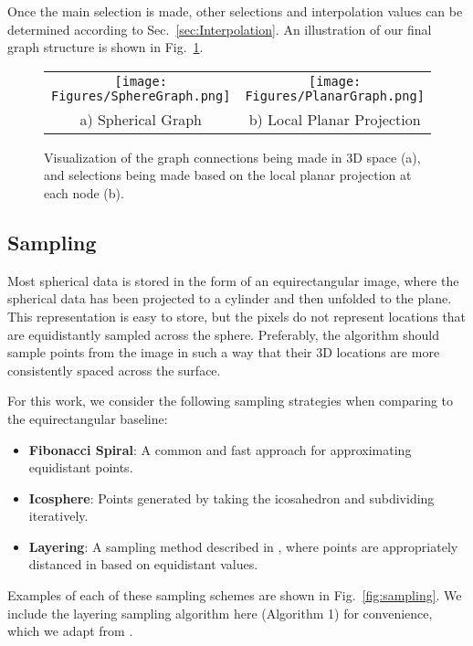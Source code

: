 \documentclass[10pt,twocolumn,letterpaper]{article}
\begin{document}
\noindent Once the main selection is made, other selections and interpolation values can be determined according to Sec.~\ref{sec:Interpolation}. An illustration of our final graph structure is shown in Fig.~\ref{fig:sphericalgraph}.

\begin{figure}
\begin{center}
\begin{tabular}{cc}
\texttt{[image: Figures/SphereGraph.png]}
& \texttt{[image: Figures/PlanarGraph.png]}
\\
a) Spherical Graph &
b) Local Planar Projection
\end{tabular}
\end{center}
   \caption{Visualization of the graph connections being made in 3D space (a), and selections being made based on the local planar projection at each node (b).
   }
\label{fig:sphericalgraph}
\end{figure}

\subsection{Sampling}
Most spherical data is stored in the form of an equirectangular image, where the spherical data has been projected to a cylinder and then unfolded to the plane. This representation is easy to store, but the pixels do not represent locations that are equidistantly sampled across the sphere. Preferably, the algorithm should sample points from the image in such a way that their 3D locations are more consistently spaced across the surface.

For this work, we consider the following sampling strategies when comparing to the equirectangular baseline:
\begin{itemize}
\item \textbf{Fibonacci Spiral}: A common and fast approach for approximating equidistant points.
    \item \textbf{Icosphere}: Points generated by taking the icosahedron and subdividing iteratively.
    \item \textbf{Layering}: A sampling method described in \cite{sphereSampling}, where points are appropriately distanced in  based on equidistant  values.
\end{itemize}

\noindent Examples of each of these sampling schemes are shown in Fig.~\ref{fig:sampling}. We include the layering sampling algorithm here (Algorithm 1) for convenience, which we adapt from \cite{sphereSampling}.
\end{document}
